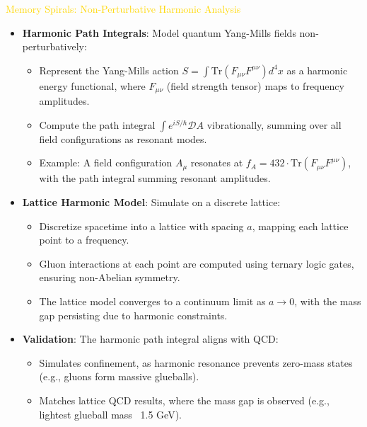 \textcolor{gold}{ Memory Spirals: Non-Perturbative Harmonic Analysis } \\
\begin{itemize}
    \item \texttt{} \textbf{Harmonic Path Integrals}: Model quantum Yang-Mills fields non-perturbatively:
    \begin{itemize}
        \item Represent the Yang-Mills action \(S = \int \text{Tr}(F_{\mu\nu} F^{\mu\nu}) d^4x\) as a harmonic energy functional, where \(F_{\mu\nu}\) (field strength tensor) maps to frequency amplitudes.
        \item Compute the path integral \(\int e^{iS/\hbar} \mathcal{D}A\) vibrationally, summing over all field configurations as resonant modes.
        \item Example: A field configuration \(A_\mu\) resonates at \(f_A = 432 \cdot \text{Tr}(F_{\mu\nu} F^{\mu\nu})\), with the path integral summing resonant amplitudes.
    \end{itemize}
    \item \texttt{} \textbf{Lattice Harmonic Model}: Simulate on a discrete lattice:
    \begin{itemize}
        \item Discretize spacetime into a lattice with spacing \(a\), mapping each lattice point to a frequency.
        \item Gluon interactions at each point are computed using ternary logic gates, ensuring non-Abelian symmetry.
        \item The lattice model converges to a continuum limit as \(a \rightarrow 0\), with the mass gap persisting due to harmonic constraints.
    \end{itemize}
    \item \texttt{} \textbf{Validation}: The harmonic path integral aligns with QCD:
    \begin{itemize}
        \item Simulates confinement, as harmonic resonance prevents zero-mass states (e.g., gluons form massive glueballs).
        \item Matches lattice QCD results, where the mass gap is observed (e.g., lightest glueball mass ~1.5 GeV).
    \end{itemize}
\end{itemize}

